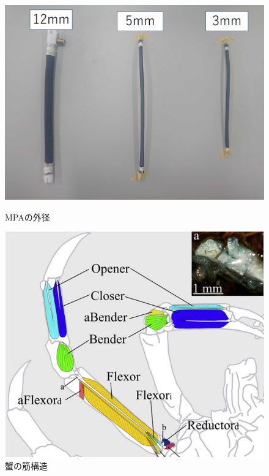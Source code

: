\documentclass{jarticle}
\begin{document}
\begin{figure}[t]
  \begin{minipage}[b]{0.47\columnwidth}
    \centering
    \includegraphics[scale=0.15]{mpa.JPG}
    \vspace{-6.5mm}
    \caption{MPAの外径}
    \label{fig:MPA}
  \end{minipage}
  \hspace{0.04\columnwidth}
  \begin{minipage}[b]{0.47\columnwidth}
    \centering
    \includegraphics[scale=0.26]{kani6.PNG}
    \vspace{-2mm}
    \caption{蟹の筋構造\cite{crab}}
    \label{fig:mus}
  \end{minipage}
\end{figure}
\end{document}
